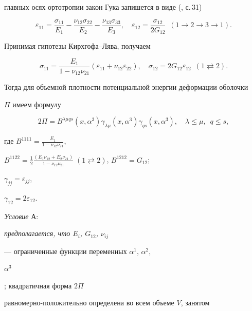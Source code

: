 главных осях ортотропии закон Гука запишется в виде (\cite{1}, с.\,31) 


$$ 


\varepsilon_{11}=\frac{\sigma_{11}}{E_1}- 


\frac{\nu_{12}\sigma_{22}}{E_2}-\frac{\nu_{13}\sigma_{33}}{E_3}, 


\quad \varepsilon_{12}=\frac{\sigma_{12}}{2G_{12}} \ \; 


(1\to 2\to 3\to 1). 


$$ 


Принимая гипотезы Кирхгофа--Лява, получаем 


$$ 


\sigma_{11}=\frac{E_1}{1-\nu_{12}\nu_{21}} 


(\varepsilon_{11}+\nu_{12}\varepsilon_{22}),\quad 


\sigma_{12}=2G_{12}\varepsilon_{12} \ \; (1\rightleftarrows 2). 


$$ 


Тогда для объемной плотности потенциальной энергии деформации оболочки 


$\Pi$ имеем формулу 


\begin{equation} 


2\Pi=B^{\lambda\mu q s}(x,\alpha^3)\gamma_{\lambda\mu} 


(x,\alpha^3)\gamma_{q s}(x,\alpha^3),\quad 


\lambda\le\mu,\ \; q\le s, 


\end{equation} 


где $B^{1111}=\frac{E_1}{1-\nu_{12}\nu_{21}}$, 


$B^{1122}=\frac{1}{2} 


\frac{(E_1\nu_{12}+E_2\nu_{21})}{1-\nu_{12}\nu_{21}}\; 


(1\rightleftarrows 2)$, $B^{1212}=G_{12}$; 


$\gamma_{jj}=\varepsilon_{jj}$, 


$\gamma_{12}=2\varepsilon_{12}$. 


 


{\it Условие} А: {\it предполагается, что $E_i$, $G_{12}$, $\nu_{ij}$ 


--- ограниченные функции переменных $\alpha^1$, $\alpha^2$, 


$\alpha^3$}; квадратичная форма $2\Pi$ 


равномерно-положительно определена во всем объеме $V$, занятом 


